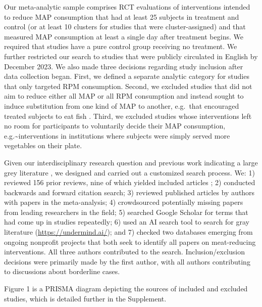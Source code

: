 \documentclass[preprint, 3p,
authoryear]{elsarticle} %
\begin{document}

Our meta-analytic sample comprises RCT evaluations of interventions
intended to reduce MAP consumption that had at least 25 subjects in
treatment and control (or at least 10 clusters for studies that were
cluster-assigned) and that measured MAP consumption at least a single
day after treatment begins. We required that studies have a pure control
group receiving no treatment. We further restricted our search to
studies that were publicly circulated in English by December 2023. We
also made three decisions regarding study inclusion after data
collection began. First, we defined a separate analytic category for
studies that only targeted RPM consumption. Second, we excluded studies
that did not aim to reduce either all MAP or all RPM consumption and
instead sought to induce substitution from one kind of MAP to another,
e.g.~that encouraged treated subjects to eat fish \citep{johansen2009}.
Third, we excluded studies whose interventions left no room for
participants to voluntarily decide their MAP consumption,
e.g.\textasciitilde interventions in institutions where subjects were
simply served more vegetables on their plate.

Given our interdisciplinary research question and previous work
indicating a large grey literature \citep{mathur2021meta}, we designed
and carried out a customized search process. We: 1) reviewed 156 prior
reviews, nine of which yielded included articles
\citep{mathur2021meta, bianchi2018conscious, bianchi2018restructuring, ammann2023, chang2023, DiGennaro2024, harguess2020, ronto2022, wynes2018};
2) conducted backwards and forward citation search; 3) reviewed
published articles by authors with papers in the meta-analysis; 4)
crowdsourced potentially missing papers from leading researchers in the
field; 5) searched Google Scholar for terms that had come up in studies
repeatedly; 6) used an AI search tool to search for gray literature
(\url{https://undermind.ai/}); and 7) checked two databases emerging
from ongoing nonprofit projects that both seek to identify all papers on
meat-reducing interventions. All three authors contributed to the
search. Inclusion/exclusion decisions were primarily made by the first
author, with all authors contributing to discussions about borderline
cases.

Figure 1 is a PRISMA diagram depicting the sources of included and
excluded studies, which is detailed further in the Supplement.
\end{document}
